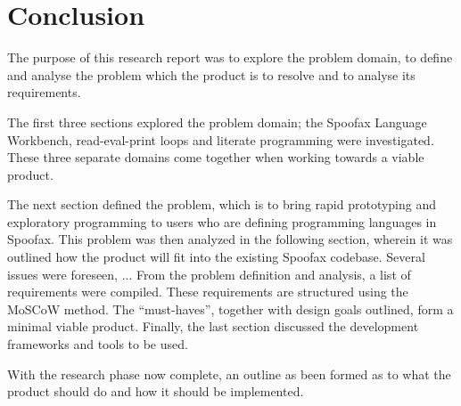 \section{Conclusion}
\label{sec:conclusion}

The purpose of this research report was to explore the problem domain, to define
and analyse the problem which the product is to resolve and to analyse its
requirements.

The first three sections explored the problem domain; the Spoofax Language
Workbench, read-eval-print loops and literate programming were investigated.
These three separate domains come together when working towards a viable product.

The next section defined the problem, which is to bring rapid prototyping and
exploratory programming to users who are defining programming languages in
Spoofax. This problem was then analyzed in the following section, wherein it
was outlined how the product will fit into the existing Spoofax codebase.
Several issues were foreseen, ... %
From the problem definition and analysis, a list of requirements were compiled.
These requirements are structured using the MoSCoW method. The ``must-haves'',
together with design goals outlined, form a minimal viable product. Finally,
the last section discussed the development frameworks and tools to be used.

With the research phase now complete, an outline as been formed as to what the
product should do and how it should be implemented.

